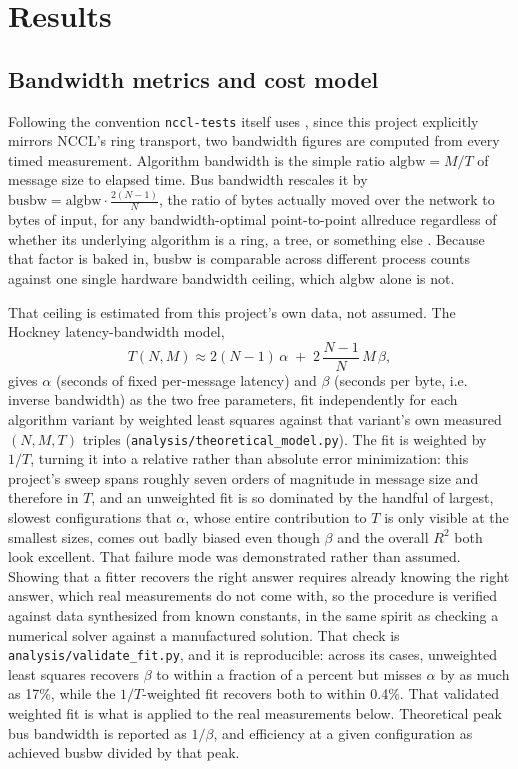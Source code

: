 \section{Results}
\label{sec:results}

\subsection{Bandwidth metrics and cost model}
\label{sec:cost-model}

Following the convention \texttt{nccl-tests} itself uses \citep{nvidia2024ncclperf}, since this project explicitly mirrors NCCL's ring transport, two bandwidth figures are computed from every timed measurement. Algorithm bandwidth is the simple ratio $\text{algbw} = M / T$ of message size to elapsed time. Bus bandwidth rescales it by $\text{busbw} = \text{algbw} \cdot \frac{2(N-1)}{N}$, the ratio of bytes actually moved over the network to bytes of input, for any bandwidth-optimal point-to-point allreduce regardless of whether its underlying algorithm is a ring, a tree, or something else \citep{nvidia2024ncclperf}. Because that factor is baked in, busbw is comparable across different process counts against one single hardware bandwidth ceiling, which algbw alone is not.

That ceiling is estimated from this project's own data, not assumed. The Hockney latency-bandwidth model,
\begin{equation}
  T(N, M) \approx 2(N-1)\,\alpha \;+\; 2\,\frac{N-1}{N}\,M\,\beta,
  \label{eq:hockney}
\end{equation}
gives $\alpha$ (seconds of fixed per-message latency) and $\beta$ (seconds per byte, i.e. inverse bandwidth) as the two free parameters, fit independently for each algorithm variant by weighted least squares against that variant's own measured $(N, M, T)$ triples (\texttt{analysis/theoretical\_model.py}). The fit is weighted by $1/T$, turning it into a relative rather than absolute error minimization: this project's sweep spans roughly seven orders of magnitude in message size and therefore in $T$, and an unweighted fit is so dominated by the handful of largest, slowest configurations that $\alpha$, whose entire contribution to $T$ is only visible at the smallest sizes, comes out badly biased even though $\beta$ and the overall $R^2$ both look excellent. That failure mode was demonstrated rather than assumed. Showing that a fitter recovers the right answer requires already knowing the right answer, which real measurements do not come with, so the procedure is verified against data synthesized from known constants, in the same spirit as checking a numerical solver against a manufactured solution. That check is \texttt{analysis/validate\_fit.py}, and it is reproducible: across its cases, unweighted least squares recovers $\beta$ to within a fraction of a percent but misses $\alpha$ by as much as 17\%, while the $1/T$-weighted fit recovers both to within 0.4\%. That validated weighted fit is what is applied to the real measurements below. Theoretical peak bus bandwidth is reported as $1/\beta$, and efficiency at a given configuration as achieved busbw divided by that peak.

